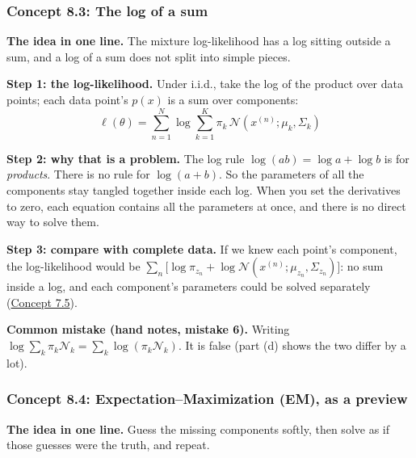 \documentclass[12pt,a4paper]{article}
\begin{document}
\subsubsection{Concept 8.3: The log of a sum}\label{c8-3}

\textbf{The idea in one line.} The mixture log-likelihood has a log sitting outside a sum, and a log of a sum does not split into simple pieces.

\textbf{Step 1: the log-likelihood.} Under i.i.d., take the log of the product over data points; each data point's $p(x)$ is a sum over components:
\[
\ell(\theta)=\sum_{n=1}^{N}\log\sum_{k=1}^{K}\pi_k\,\mathcal{N}(x^{(n)};\mu_k,\Sigma_k)
\]

\textbf{Step 2: why that is a problem.} The log rule $\log(ab)=\log a+\log b$ is for \emph{products}. There is no rule for $\log(a+b)$. So the parameters of all the components stay tangled together inside each log. When you set the derivatives to zero, each equation contains all the parameters at once, and there is no direct way to solve them.

\textbf{Step 3: compare with complete data.} If we knew each point's component, the log-likelihood would be $\sum_n\big[\log\pi_{z_n}+\log\mathcal{N}(x^{(n)};\mu_{z_n},\Sigma_{z_n})\big]$: no sum inside a log, and each component's parameters could be solved separately (\hyperref[c7-5]{Concept 7.5}).

\textbf{Common mistake (hand notes, mistake 6).} Writing $\log\sum_k\pi_k\mathcal{N}_k=\sum_k\log(\pi_k\mathcal{N}_k)$. It is false (part (d) shows the two differ by a lot).

\subsubsection{Concept 8.4: Expectation--Maximization (EM), as a preview}\label{c8-4}

\textbf{The idea in one line.} Guess the missing components softly, then solve as if those guesses were the truth, and repeat.
\end{document}
